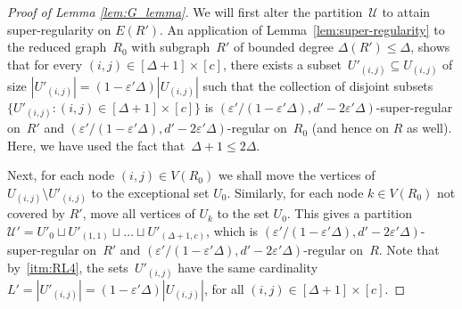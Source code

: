 \documentclass[final]{article}
\theoremstyle{definition}
\newcommand{\eps}{\varepsilon}
\begin{document}
\begin{proof}[Proof of Lemma \ref{lem:G_lemma}]
 We will first alter the partition~$\mathcal{U}$ to attain super-regularity on $E(R')$. An application of Lemma~\ref{lem:super-regularity} to the reduced graph~$R_0$ with subgraph~$R'$ of bounded degree $\Delta(R') \leq \Delta$, shows that for every $(i,j) \in [\Delta+1] \times [c]$, there exists a subset~$U'_{(i,j)} \subseteq U_{(i,j)}$ of size $|U'_{(i,j)}| = (1-\eps'\Delta)|U_{(i,j)}|$ such that the collection of disjoint subsets $\bigl\{U'_{(i,j)}: (i,j) \in [\Delta+1]\times[c]\bigr\}$ is $(\eps'/(1-\eps'\Delta), d'-2\eps'\Delta)$-super-regular on~$R'$ and $(\eps'/(1-\eps'\Delta), d'-2\eps'\Delta)$-regular on~$R_0$ (and hence on $R$ as well). Here, we have used the fact that~$\Delta+1 \leq 2\Delta$. 
 
 Next, for each node $(i,j) \in V(R_0)$ we shall move the vertices of~$U_{(i,j)} \setminus U'_{(i,j)}$ to the exceptional set $U_0$. Similarly, for each node $k \in V(R_0)$ not covered by $R'$, move all vertices of $U_k$ to the set $U_0$. This gives a partition $\mathcal{U}' = U'_0 \sqcup U'_{(1,1)} \sqcup \dots \sqcup U'_{(\Delta + 1, c)}$, which is $(\eps'/(1-\eps'\Delta), d'-2\eps'\Delta)$-super-regular on~$R'$ and $(\eps'/(1-\eps'\Delta), d'-2\eps'\Delta)$-regular on~$R$. Note that by~\ref{itm:RL4}, the sets~$U'_{(i,j)}$ have the same cardinality $L' = |U'_{(i,j)}| = (1-\eps'\Delta)|U_{(i,j)}|$, for all $(i,j) \in [\Delta+1]\times[c]$. 
 

\end{proof}
\end{document}
